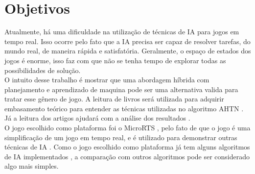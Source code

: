 \chapter{\label{chap:obje}Objetivos}

Atualmente, há uma dificuldade na utilização de técnicas de IA para jogos em tempo real. Isso ocorre pelo fato que a IA precisa ser capaz de resolver tarefas, do mundo real, de maneira rápida e satisfatória. Geralmente, o espaço de estados dos jogos é enorme, isso faz com que não se tenha tempo de explorar todas as possibilidades de solução.   \\


O intuito desse trabalho é mostrar que uma abordagem híbrida com planejamento e aprendizado de maquina pode ser uma alternativa valida para tratar esse gênero de jogo. 
A leitura de livros será utilizada para adquirir embasamento teórico \cite{ghallab2004automated,intelligence2003modern,Mitchell1997ML} para entender as técnicas utilizadas no algoritmo AHTN \cite{ontanon2015adversarial}. Já a leitura dos artigos ajudará com a análise dos resultados \cite{ontanon2012experiments,hogg2010learning,ontanon2013survey}.
 \\ 
O jogo escolhido como plataforma foi o MicroRTS \cite{ontanon2013combinatorial}, pelo fato de que o jogo é uma simplificação de um jogo em tempo real, e é utilizado para demonstrar outras técnicas de IA . Como o jogo escolhido como plataforma já tem alguns algoritmos de IA implementados %
, a comparação com outros algoritmos pode ser considerado algo mais simples. %



